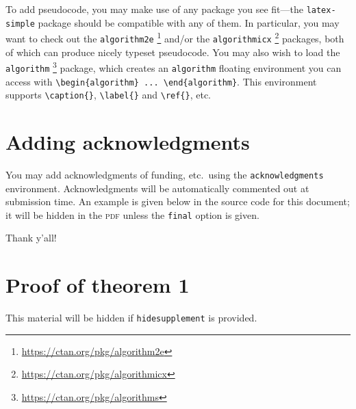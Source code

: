 \documentclass[11pt]{article}
\begin{document}
To add pseudocode, you may make use of any package you see fit---the \texttt{latex-simple} package should be compatible with any of them. In particular, you may want to check out the \texttt{algorithm2e}%
%
\footnote{\url{https://ctan.org/pkg/algorithm2e}}
%
and/or the \texttt{algorithmicx}%
%
\footnote{\url{https://ctan.org/pkg/algorithmicx}}
%
packages, both of which can produce nicely typeset pseudocode. You may also wish
to load the \texttt{algorithm}%
%
\footnote{\url{https://ctan.org/pkg/algorithms}}
%
package, which creates an \texttt{algorithm} floating environment you can access
with \verb|\begin{algorithm} ... \end{algorithm}|. This environment supports
\verb|\caption{}|, \verb|\label{}| and \verb|\ref{}|, etc.

\section{Adding acknowledgments}

You may add acknowledgments of funding, etc.\ using the \texttt{acknowledgments} environment. Acknowledgments will be automatically commented out at submission time. An example is given below in the source code for this document; it will be hidden in the \textsc{pdf} unless the \texttt{final} option is given.

\begin{acknowledgements}
  Thank y'all!
\end{acknowledgements}







\appendix

\section{Proof of theorem 1}

This material will be hidden if \texttt{hidesupplement} is provided.
\end{document}
